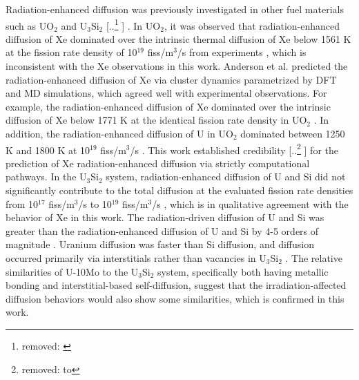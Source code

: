 \documentclass[preprint,12pt]{elsarticle}
\providecommand{\DIFadd}[1]{{\protect\color{blue} \sf #1}} %
\providecommand{\DIFdel}[1]{{\protect\color{red} [..\footnote{removed: #1} ]}} %
\providecommand{\DIFaddbegin}{} %
\providecommand{\DIFaddend}{} %
\providecommand{\DIFdelbegin}{} %
\providecommand{\DIFdelend}{} %
\newcommand{\DIFscaledelfig}{0.5}
\newlength{\DIFdelgraphicswidth} %
\newlength{\DIFdelgraphicsheight} %
\newcommand{\DIFaddincludegraphics}[2][]{{\color{blue}\fbox{\DIFOincludegraphics[#1]{#2}}}} %
\newcommand{\DIFdelincludegraphics}[2][]{%
\sbox{\DIFdelgraphicsbox}{\DIFOincludegraphics[#1]{#2}}%
\settoboxwidth{\DIFdelgraphicswidth}{\DIFdelgraphicsbox} %
\settoboxtotalheight{\DIFdelgraphicsheight}{\DIFdelgraphicsbox} %
\scalebox{\DIFscaledelfig}{%
\parbox[b]{\DIFdelgraphicswidth}{\usebox{\DIFdelgraphicsbox}\\[-\baselineskip] \rule{\DIFdelgraphicswidth}{0em}}\llap{\resizebox{\DIFdelgraphicswidth}{\DIFdelgraphicsheight}{%
\setlength{\unitlength}{\DIFdelgraphicswidth}%
\begin{picture}(1,1)%
\thicklines\linethickness{2pt} %
{\color[rgb]{1,0,0}\put(0,0){\framebox(1,1){}}}%
{\color[rgb]{1,0,0}\put(0,0){\line( 1,1){1}}}%
{\color[rgb]{1,0,0}\put(0,1){\line(1,-1){1}}}%
\end{picture}%
}\hspace*{3pt}}} %
} %
\DeclareRobustCommand{\DIFaddbegin}{\DIFOaddbegin \let\includegraphics\DIFaddincludegraphics} %
\DeclareRobustCommand{\DIFaddend}{\DIFOaddend \let\includegraphics\DIFOincludegraphics} %
\DeclareRobustCommand{\DIFdelbegin}{\DIFOdelbegin \let\includegraphics\DIFdelincludegraphics} %
\DeclareRobustCommand{\DIFdelend}{\DIFOaddend \let\includegraphics\DIFOincludegraphics} %
\begin{document}
\DIFaddend \indent Radiation-enhanced diffusion was previously investigated in other fuel materials such as UO$_{2}$ \DIFaddbegin \DIFadd{\cite{cooper2021irradiation, andersson2014atomistic} }\DIFaddend and U$_{3}$Si$_{2}$ \DIFdelbegin \DIFdel{\cite{cooper2021irradiation, andersson2014atomistic, matthews2020cluster}}\DIFdelend \DIFaddbegin \DIFadd{\cite{matthews2020cluster}}\DIFaddend . In UO$_{2}$, it was observed that radiation-enhanced diffusion of Xe dominated over the intrinsic thermal diffusion of Xe below 1561 K at the fission rate density of 10$^{19}$ fiss/m$^{3}$/s from experiments \cite{turnbull1982diffusion}, which is inconsistent with the Xe observations in this work. Anderson et al. \cite{andersson2014atomistic} predicted the radiation-enhanced diffusion of Xe via cluster dynamics parametrized by DFT and MD simulations, which agreed well with experimental observations. For example, the radiation-enhanced diffusion of Xe dominated over the intrinsic diffusion of Xe below 1771 K at the identical fission rate density in UO$_{2}$ \cite{turnbull1982diffusion, andersson2014atomistic}. In addition, the radiation-enhanced diffusion of U in UO$_{2}$ dominated between 1250 K and 1800 K at 10$^{19}$ fiss/m$^{3}$/s \cite{matthews2020cluster}. This work established credibility \DIFdelbegin \DIFdel{to }\DIFdelend \DIFaddbegin \DIFadd{for }\DIFaddend the prediction of Xe radiation-enhanced diffusion via strictly computational pathways. In the U$_{3}$Si$_{2}$ system, radiation-enhanced diffusion of U and Si did not significantly contribute to the total diffusion at the evaluated fission rate densities from 10$^{17}$ fiss/m$^{3}$/s to 10$^{19}$ fiss/m$^{3}$/s \cite{cooper2021irradiation}, which is in qualitative agreement with the behavior of Xe in this work. The radiation-driven diffusion of U and Si was greater than the radiation-enhanced diffusion of U and Si by 4-5 orders of magnitude \cite{cooper2021irradiation}. Uranium diffusion was faster than Si diffusion, and diffusion occurred primarily via interstitials rather than vacancies in U$_{3}$Si$_{2}$ \cite{cooper2021irradiation, andersson2019density}. The relative similarities of U-10Mo to the U$_{3}$Si$_{2}$ system, specifically both having metallic bonding and interstitial-based self-diffusion, suggest that the irradiation-affected diffusion behaviors would also show some similarities, which is confirmed in this work.
\DIFaddbegin 
\end{document}
